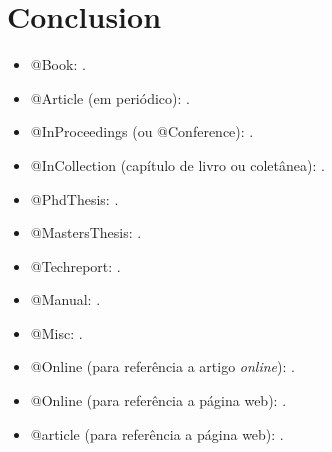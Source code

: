 \documentclass[english,notblind]{sbc20}
\begin{document}
\section{Conclusion}

\begin{itemize}
  \item @Book: \cite{Knuth:96}.

  \item @Article (em periódico): \cite{floats2014}.

  \item @InProceedings (ou @Conference): \cite{alves03:simi}.

  \item @InCollection (capítulo de livro ou coletânea): \cite{bobaoglu93:concepts}.

  \item @PhdThesis: \cite{garcia01:PhD}.

  \item @MastersThesis: \cite{schmidt03:MSc}.

  \item @Techreport: \cite{alvisi99:analysisCIC}.

  \item @Manual: \cite{biblatex}.

  \item @Misc: \cite{gridftp}.

  \item @Online (para referência a artigo \emph{online}): \cite{fowler04:designDead}.

  \item @Online (para referência a página web): \cite{FSF:GNU-GPL}.

  \item @article (para referência a página web): \cite{alon09:how}.
  
\end{itemize}


\SBCprintbibliography
\end{document}

